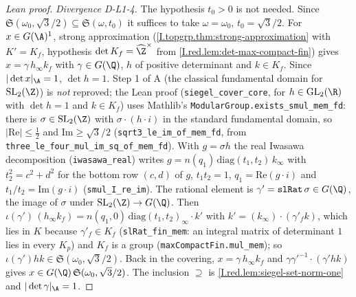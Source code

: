 \begin{proof}[Lean proof]
\emph{Divergence D-L1-4.} The hypothesis $t_0>0$ is not needed. Since $\mathfrak S(\omega_0,\sqrt3/2)\subseteq\mathfrak S(\omega,t_0)$ it suffices to take $\omega=\omega_0$, $t_0=\sqrt3/2$. For $x\in G(\A)^1$, strong approximation (\cref{I.topgrp.thm:strong-approximation} with $K'=K_f$, hypothesis $\det K_f=\widehat\Z^\times$ from \cref{I.red.lem:det-max-compact-fin}) gives $x=\gamma\,h_\infty k_f$ with $\gamma\in G(\Q)$, $h$ of positive determinant and $k\in K_f$. Since $|\det x|_\A=1$, $\det h=1$. Step 1 of A (the classical fundamental domain for $\mathrm{SL}_2(\Z)$) is \emph{not} reproved; the Lean proof (\texttt{siegel\_cover\_core}, for $h\in\mathrm{GL}_2(\R)$ with $\det h=1$ and $k\in K_f$) uses Mathlib's \texttt{ModularGroup.exists\_smul\_mem\_fd}: there is $\sigma\in\mathrm{SL}_2(\Z)$ with $\sigma\cdot(h\cdot i)$ in the standard fundamental domain, so $|\mathrm{Re}|\le\tfrac12$ and $\mathrm{Im}\ge\sqrt3/2$ (\texttt{sqrt3\_le\_im\_of\_mem\_fd}, from \texttt{three\_le\_four\_mul\_im\_sq\_of\_mem\_fd}). With $g=\sigma h$ the real Iwasawa decomposition (\texttt{iwasawa\_real}) writes $g=n(q_1)\,\mathrm{diag}(t_1,t_2)\,k_\infty$ with $t_2^2=c^2+d^2$ for the bottom row $(c,d)$ of $g$, $t_1t_2=1$, $q_1=\mathrm{Re}(g\cdot i)$ and $t_1/t_2=\mathrm{Im}(g\cdot i)$ (\texttt{smul\_I\_re\_im}). The rational element is $\gamma'=\texttt{slRat}\,\sigma\in G(\Q)$, the image of $\sigma$ under $\mathrm{SL}_2(\Z)\to G(\Q)$. Then $\iota(\gamma')\,(h_\infty k_f)=n(q_1,0)\,\mathrm{diag}(t_1,t_2)_\infty\cdot k'$ with $k'=(k_\infty)\cdot(\gamma'_f k)$, which lies in $K$ because $\gamma'_f\in K_f$ (\texttt{slRat\_fin\_mem}: an integral matrix of determinant $1$ lies in every $K_p$) and $K_f$ is a group (\texttt{maxCompactFin.mul\_mem}); so $\iota(\gamma')h k\in\mathfrak S(\omega_0,\sqrt3/2)$. Back in the covering, $x=\gamma\,h_\infty k_f$ and $\gamma\gamma'^{-1}\cdot(\gamma' h k)$ gives $x\in G(\Q)\,\mathfrak S(\omega_0,\sqrt3/2)$. The inclusion $\supseteq$ is \cref{I.red.lem:siegel-set-norm-one} and $|\det\gamma|_\A=1$.
\end{proof}

